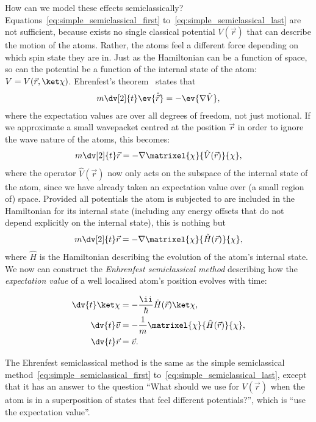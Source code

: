 How can we model these effects semiclassically? Equations~\eqref{eq:simple_semiclassical_first} to~\eqref{eq:simple_semiclassical_last} are not sufficient, because exists no single classical potential $V(\vec r)$ that can describe the motion of the atoms. Rather, the atoms feel a different force depending on which spin state they are in. Just as the Hamiltonian can be a function of space, so can the potential be a function of the internal state of the atom: $V = V(\vec{r}, \ket\chi)$. Ehrenfest's theorem~\cite{Ehrenfest1927} states that
\begin{align}
m\dv[2]{t}\ev{\hat{\vec r}} = - \ev{\nabla \hat V},
\end{align}
where the expectation values are over all degrees of freedom, not just motional. If we approximate a small wavepacket centred at the position $\vec r$ in order to ignore the wave nature of the atoms, this becomes:
\begin{align}
m\dv[2]{t} \vec r = - \nabla \matrixel{\chi}{\hat V(\vec r)}{\chi},
\end{align}
where the operator $\hat V(\vec r)$ now only acts on the subspace of the internal state of the atom, since we have already taken an expectation value over (a small region of) space. Provided all potentials the atom is subjected to are included in the Hamiltonian for its internal state (including any energy offsets that do not
depend explicitly on the internal state), this is nothing but
\begin{align}
m\dv[2]{t} \vec r = - \nabla \matrixel{\chi}{\hat H(\vec r)}{\chi},
\end{align}
where $\hat H$ is the Hamiltonian describing the evolution of the atom's internal state. We now can construct the \emph{Enhrenfest semiclassical method} describing how the \emph{expectation value} of a well localised atom's position evolves with time:

\begin{align}\label{eq:ehrenfest_semiclassical_first}
\dv{t}\ket\chi &= -\frac\ii\hbar \hat H(\vec r)\ket\chi,\\
\dv{t}\vec v &= -\frac1m\matrixel{\chi}{\hat H(\vec r)}{\chi},\\
\dv{t}\vec r &= \vec v\label{eq:ehrenfest_semiclassical_last}.
\end{align}

The Ehrenfest semiclassical method is the same as the simple semiclassical method~\eqref{eq:simple_semiclassical_first} to~\eqref{eq:simple_semiclassical_last}, except that it has an answer to the question ``What should we use for $V(\vec r)$ when the atom is in a superposition of states that feel different potentials?'', which is ``use the expectation value''. 

